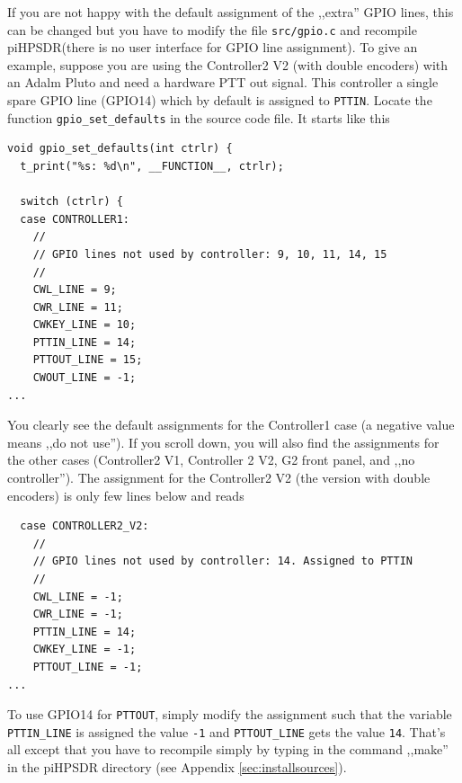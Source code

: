 \documentclass[12pt]{book}
\def\rett#1{\texttt{\color{red}#1}}
\def\pH{pi\-HPSDR\xspace}
\begin{document}
If you are not happy with the default assignment of the ,,extra'' GPIO lines, this can be changed
but you have to modify the file \texttt{src/gpio.c} and recompile \pH (there is no user interface
for GPIO line assignment). To give an example, suppose you are using the Controller2 V2 (with double
encoders) with an Adalm Pluto and need a hardware PTT out signal. This controller a single spare GPIO line
(GPIO14) which by default is assigned to \rett{PTTIN}. Locate the function \texttt{gpio\_set\_defaults}
in the source code file. It starts like this

\begin{small}
\begin{verbatim}
void gpio_set_defaults(int ctrlr) {
  t_print("%s: %d\n", __FUNCTION__, ctrlr);

  switch (ctrlr) {
  case CONTROLLER1:
    //
    // GPIO lines not used by controller: 9, 10, 11, 14, 15
    //
    CWL_LINE = 9;
    CWR_LINE = 11;
    CWKEY_LINE = 10;
    PTTIN_LINE = 14;
    PTTOUT_LINE = 15;
    CWOUT_LINE = -1;
...
\end{verbatim}
\end{small}

You clearly see the default assignments for the Controller1 case (a negative value means ,,do not use'').
If you scroll down, you will also find the assignments for the other cases (Controller2 V1, Controller 2 V2,
G2 front panel, and ,,no controller''). The assignment for the Controller2 V2 (the version with double
encoders) is only few lines below and reads

\begin{small}
\begin{verbatim}
  case CONTROLLER2_V2:
    //
    // GPIO lines not used by controller: 14. Assigned to PTTIN
    //
    CWL_LINE = -1;
    CWR_LINE = -1;
    PTTIN_LINE = 14;
    CWKEY_LINE = -1;
    PTTOUT_LINE = -1;
...
\end{verbatim}
\end{small}

To use GPIO14 for \texttt{PTTOUT}, simply modify the assignment such that the variable
 \texttt{PTTIN\_LINE} is assigned the
value \texttt{-1} and \texttt{PTTOUT\_LINE} gets the value \texttt{14}.
 That's all except that you have to recompile
simply by typing in the command ,,make'' in the \pH directory (see Appendix \ref{sec:installsources}).


\end{document}
